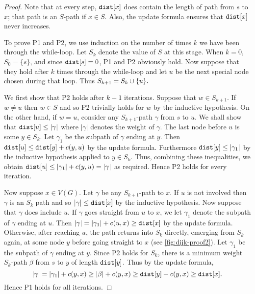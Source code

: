 \begin{proof} 
Note that at every step, $\dist[x]$ does contain
the length of  path from $s$ to $x$; that path is an
$S$-path if $x\in S$. Also, the update formula ensures that $\dist[x]$
never increases. 

To prove P1 and P2, we use induction on the number of times $k$ we
have been through the while-loop. Let $S_k$ denote the value of $S$
at this stage. When $k=0$, $S_0=\{s\}$, and since $\dist[s]=0$, P1 and
P2 obviously hold. Now suppose that they hold after $k$ times through
the while-loop and let $u$ be the next special node chosen during that
loop. Thus $S_{k+1} = S_k \cup \mbox{$\{u\}$}.$

We first show that P2 holds after $k+1$ iterations. Suppose that
$w\in S_{k+1}$.  If $w\neq u$ then $w\in S$ and so P2 trivially
holds for $w$ by the inductive hypothesis. On the other hand,
if $w=u$, consider any $S_{k+1}$-path $\gamma$ from $s$ to $u$.
We shall show that $\dist[u] \leq
|\gamma |$ where $| \gamma | $ denotes the weight of $\gamma$. The
last node before $u$ is some $y\in S_k$. Let $\gamma_1$ be the subpath
of $\gamma$ ending at $y$. Then $\dist[u] \leq \dist[y] + c(y,u)$ by the
update formula. Furthermore $\dist[y] \leq |\gamma_1 |$ by the inductive
hypothesis applied to $y\in S_k$. Thus, combining these inequalities,
we obtain $\dist[u] \leq |\gamma_1 | + c(y, u) = | \gamma |$ as
required. Hence P2 holds for every iteration.

Now suppose $x\in V(G)$. Let $\gamma$ be any $S_{k+1}$-path to $x$. If
$u$ is not involved then $\gamma$ is an $S_k$ path and so $|\gamma| \leq
\dist[x]$ by the inductive hypothesis. Now suppose that $\gamma$ does
include $u$. 
If $\gamma$ goes straight from $u$ to $x$, we let $\gamma_1$ denote the 
subpath of $\gamma$ ending at $u$. Then $|\gamma| = |\gamma_1| + c(u,x) \geq 
\dist[x]$ by the update formula. 
Otherwise, after reaching $u$, the path returns into $S_k$
directly, emerging from $S_k$ again, at some node $y$ before going
straight to $x$ (see \cref{fig:dijk-proof2}). Let $\gamma_1$
be the subpath of $\gamma$ ending at $y$. Since P2 holds for $S_k$,
there is a minimum weight $S_k$-path $\beta$ from $s$ to $y$ of length
$\dist[y]$. Thus by the update formula, 
$$
|\gamma| = |\gamma_1| + c(y,
x) \geq |\beta| + c(y, x) \geq \dist[y] + c(y, x) \geq \dist[x].
$$ 
Hence P1 holds for all iterations.
\end{proof}

